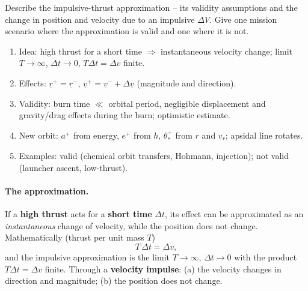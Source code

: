 
\begin{qbox}
Describe the impulsive-thrust approximation -- its validity assumptions and the change in position and velocity due to an
impulsive $\Delta V$. Give one mission scenario where the approximation is valid and one where it is not.
\end{qbox}

\begin{outline}
\begin{enumerate}
\item Idea: high thrust for a short time $\Rightarrow$ instantaneous velocity change; limit $T\to\infty$, $\Delta t\to0$, $T\Delta t=\Delta v$ finite.
\item Effects: $\underline r^+=\underline r^-$, $\underline v^+=\underline v^-+\Delta\underline v$ (magnitude and direction).
\item Validity: burn time $\ll$ orbital period, negligible displacement and gravity/drag effects during the burn; optimistic estimate.
\item New orbit: $a^+$ from energy, $e^+$ from $h$, $\theta_*^+$ from $r$ and $v_r$; apsidal line rotates.
\item Examples: valid (chemical orbit transfers, Hohmann, injection); not valid (launcher ascent, low-thrust).
\end{enumerate}
\end{outline}

\answer
\paragraph{The approximation.} If a \textbf{high thrust} acts for a \textbf{short time} $\Delta t$, its effect can be approximated as an
\emph{instantaneous} change of velocity, while the position does not change. Mathematically (thrust per unit mass $T$)
\begin{equation}
T\,\Delta t=\Delta v,
\end{equation}
and the impulsive approximation is the limit $T\to\infty$, $\Delta t\to0$ with the product $T\Delta t=\Delta v$ finite. Through a
\textbf{velocity impulse}: (a) the velocity changes in direction and magnitude; (b) the position does not change.

